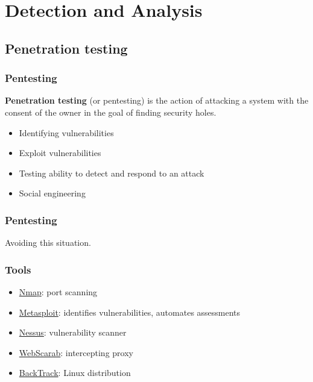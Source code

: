 \section{Detection and Analysis}

\begin{frame}
\sectionpage
\end{frame}

\subsection{Penetration testing}

\begin{frame}
\frametitle{Pentesting}
\textbf{Penetration testing} (or pentesting) is the action of attacking a
system with the consent of the owner in the goal of finding security holes.
\begin{itemize}
\item Identifying vulnerabilities
\item Exploit vulnerabilities
\item Testing ability to detect and respond to an attack
\item Social engineering
\end{itemize}
\end{frame}

\begin{frame}
\frametitle{Pentesting}
\begin{center}
Avoiding this situation.
\end{center}
\end{frame}

\begin{frame}
\frametitle{Tools}
\begin{itemize}
\item \href{http://nmap.org/}{Nmap}:
	port scanning
\item \href{http://www.metasploit.com/about/penetration-testing-basics/}{Metasploit}:
	identifies vulnerabilities, automates assessments
\item \href{http://www.tenable.com/products/nessus}{Nessus}:
	vulnerability scanner
\item \href{https://www.owasp.org/index.php/Webscarab}{WebScarab}:
	intercepting proxy
\item \href{http://www.backtrack-linux.org/}{BackTrack}:
	Linux distribution
\end{itemize}
\end{frame}

